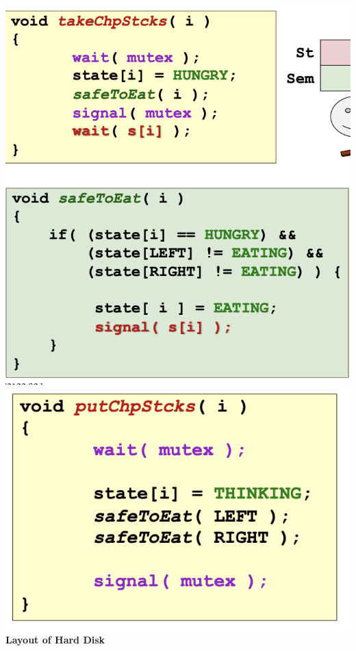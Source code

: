 \documentclass[10pt, a4paper]{article}
\begin{document}
\begin{multicols*}{3}
		\includegraphics[scale=.38]{./assets/tanenbaum2.png}
		\includegraphics[scale=.38]{./assets/tanenbaum3.png}\\

		\textbf{Layout of Hard Disk}


\end{multicols*}
\end{document}
